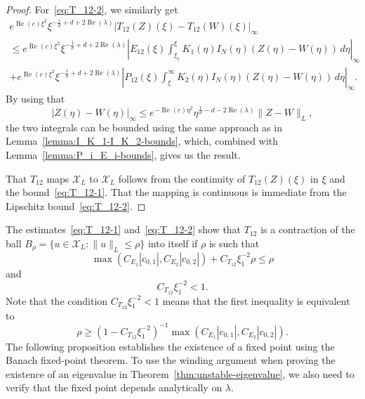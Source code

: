 \documentclass[11pt]{article}
\DeclareMathOperator{\real}{Re}
\newcommand{\Space}{\mathcal{X}}
\begin{document}
\begin{proof}
  For~\eqref{eq:T_12-2}, we similarly get
  \begin{multline*}
    e^{\real(c)\xi^{2}}\xi^{-\frac{1}{\sigma} + d + 2\real(\lambda)}|T_{12}(Z)(\xi) - T_{12}(W)(\xi)|_{\infty}\\
    \leq e^{\real(c)\xi^{2}}\xi^{-\frac{1}{\sigma} + d + 2\real(\lambda)}
    \left|E_{12}(\xi)\int_{\xi_{1}}^{\xi} K_{1}(\eta)I_{N}(\eta)(Z(\eta) - W(\eta))\,d\eta\right|_{\infty}\\
    + e^{\real(c)\xi^{2}}\xi^{-\frac{1}{\sigma} + d + 2\real(\lambda)}
    \left|P_{12}(\xi)\int_{\xi}^{\infty} K_{2}(\eta)I_{N}(\eta)(Z(\eta) - W(\eta))\,d\eta\right|_{\infty}.
  \end{multline*}
  By using that
  \begin{equation*}
    |Z(\eta) - W(\eta)|_{\infty} \leq e^{-\real(c)\eta^{2}}\eta^{\frac{1}{\sigma} - d - 2\real(\lambda)}\|Z - W\|_{L},
  \end{equation*}
  the two integrals can be bounded using the same approach as in
  Lemma~\ref{lemma:I_K_1-I_K_2-bounds}, which, combined with
  Lemma~\ref{lemma:P_i_E_i-bounds}, gives us the result.

  That \(T_{12}\) maps \(\Space_{L}\) to \(\Space_{L}\) follows from
  the continuity of \(T_{12}(Z)(\xi)\) in \(\xi\) and the
  bound~\eqref{eq:T_12-1}. That the mapping is continuous is immediate
  from the Lipschitz bound~\eqref{eq:T_12-2}.
\end{proof}

The estimates~\eqref{eq:T_12-1} and~\eqref{eq:T_12-2} show that
\(T_{12}\) is a contraction of the ball
\(B_{\rho} = \{u \in \Space_{L} \colon \|u\|_{L} \leq \rho\}\) into
itself if \(\rho\) is such that
\begin{equation*}
  \max(C_{E_{1}}|c_{0,1}|, C_{E_{2}}|c_{0,2}|) + C_{T_{12}}\xi_{1}^{-2}\rho \leq \rho
\end{equation*}
and
\begin{equation}
  \label{eq:T_12-ineq-2}
  C_{T_{12}}\xi_{1}^{-2} < 1.
\end{equation}
Note that the condition \(C_{T_{12}}\xi_{1}^{-2} < 1\) means that the
first inequality is equivalent to
\begin{equation}
  \label{eq:T_12-ineq-1}
  \rho \geq (1 - C_{T_{12}}\xi_{1}^{-2})^{-1}\max(C_{E_{1}}|c_{0,1}|, C_{E_{2}}|c_{0,2}|).
\end{equation}
The following proposition establishes the existence of a fixed point
using the Banach fixed-point theorem. To use the winding argument
when proving the existence of an eigenvalue in
Theorem~\ref{thm:unstable-eigenvalue}, we also need to verify that the
fixed point depends analytically on \(\lambda\).
\end{document}
